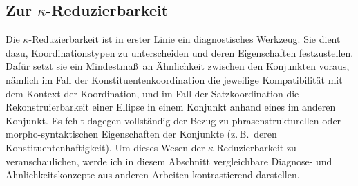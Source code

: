 \subsection{Zur $\kappa$-Reduzierbarkeit} \label{sec-koordinationsellipsen-5}

Die $\kappa$-Reduzierbarkeit ist in erster Linie ein diagnostisches Werkzeug. Sie dient dazu, Koordinationstypen zu unterscheiden und deren Eigenschaften festzustellen. Dafür setzt sie ein Mindestma\ss\ an Ähnlichkeit zwischen den Konjunkten voraus, nämlich im Fall der Konstituentenkoordination die jeweilige Kompatibilität mit dem Kontext der Koordination, und im Fall der Satzkoordination die Rekonstruierbarkeit einer  Ellipse in einem Konjunkt anhand eines  im anderen Konjunkt. Es fehlt dagegen vollständig der Bezug zu phrasenstrukturellen oder morpho-syntaktischen Eigenschaften der Konjunkte (z.\,B.\  deren Konstituentenhaftigkeit).  
Um dieses Wesen der $\kappa$-Reduzierbarkeit zu veranschaulichen, werde ich in diesem Abschnitt vergleichbare Diagnose- und Ähnlichkeitskonzepte aus anderen Arbeiten kontrastierend darstellen. 


